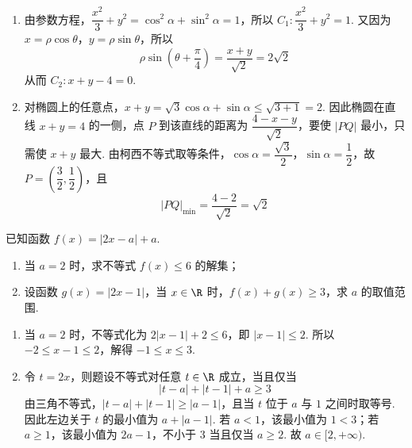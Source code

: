 \begin{solution}
\begin{enumerate}
\item 由参数方程，\(\dfrac{x^2}{3}+y^2=\cos^2\alpha+\sin^2\alpha=1\)，所以 \(C_1:\dfrac{x^2}{3}+y^2=1\). 又因为 \(x=\rho\cos\theta\)，\(y=\rho\sin\theta\)，所以
\[
\rho\sin\left(\theta+\frac\pi4\right)=\frac{x+y}{\sqrt2}=2\sqrt2
\]
从而 \(C_2:x+y-4=0\).
\item 对椭圆上的任意点，\(x+y=\sqrt3\cos\alpha+\sin\alpha\le\sqrt{3+1}=2\). 因此椭圆在直线 \(x+y=4\) 的一侧，点 \(P\) 到该直线的距离为 \(\dfrac{4-x-y}{\sqrt2}\)，要使 \(|PQ|\) 最小，只需使 \(x+y\) 最大. 由柯西不等式取等条件，\(\cos\alpha=\dfrac{\sqrt3}{2}\)，\(\sin\alpha=\dfrac12\)，故 \(P=\left(\dfrac32,\dfrac12\right)\)，且
\[
|PQ|_{\min}=\frac{4-2}{\sqrt2}=\sqrt2
\]
\end{enumerate}
\end{solution}

\begin{problem}
已知函数 \(f(x)=|2x-a|+a\).

\begin{enumerate}
\item 当 \(a=2\) 时，求不等式 \(f(x)\le6\) 的解集；
\item 设函数 \(g(x)=|2x-1|\)，当 \(x\in\R\) 时，\(f(x)+g(x)\ge3\)，求 \(a\) 的取值范围.
\end{enumerate}
\end{problem}

\begin{solution}
\begin{enumerate}
\item 当 \(a=2\) 时，不等式化为 \(2|x-1|+2\le6\)，即 \(|x-1|\le2\). 所以 \(-2\le x-1\le2\)，解得 \(-1\le x\le3\).
\item 令 \(t=2x\)，则题设不等式对任意 \(t\in\R\) 成立，当且仅当
\[
|t-a|+|t-1|+a\ge3
\]
由三角不等式，\(|t-a|+|t-1|\ge|a-1|\)，且当 \(t\) 位于 \(a\) 与 \(1\) 之间时取等号. 因此左边关于 \(t\) 的最小值为 \(a+|a-1|\). 若 \(a<1\)，该最小值为 \(1<3\)；若 \(a\ge1\)，该最小值为 \(2a-1\)，不小于 3 当且仅当 \(a\ge2\). 故 \(a\in[2,+\infty)\).
\end{enumerate}
\end{solution}
